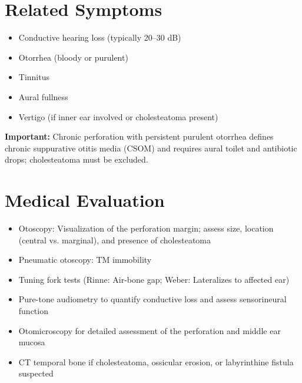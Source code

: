\section*{Related Symptoms}
\begin{itemize}
  \item Conductive hearing loss (typically 20--30 dB)
  \item Otorrhea (bloody or purulent)
  \item Tinnitus
  \item Aural fullness
  \item Vertigo (if inner ear involved or cholesteatoma present)
\end{itemize}
\textbf{Important:} Chronic perforation with persistent purulent otorrhea defines chronic suppurative otitis media (CSOM) and requires aural toilet and antibiotic drops; cholesteatoma must be excluded.

\section*{Medical Evaluation}
\begin{itemize}
  \item Otoscopy: Visualization of the perforation margin; assess size, location (central vs. marginal), and presence of cholesteatoma
  \item Pneumatic otoscopy: TM immobility
  \item Tuning fork tests (Rinne: Air-bone gap; Weber: Lateralizes to affected ear)
  \item Pure-tone audiometry to quantify conductive loss and assess sensorineural function
  \item Otomicroscopy for detailed assessment of the perforation and middle ear mucosa
  \item CT temporal bone if cholesteatoma, ossicular erosion, or labyrinthine fistula suspected
\end{itemize}

